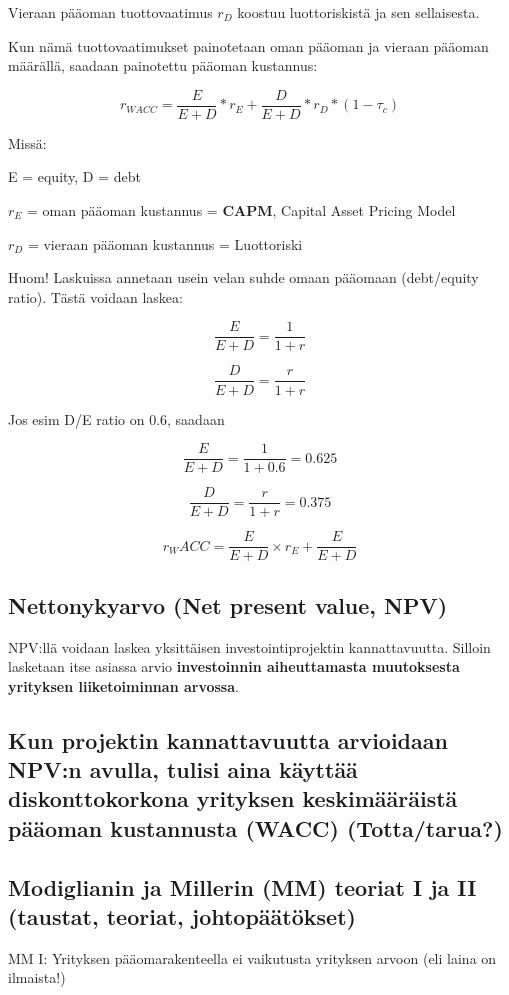 \documentclass[a4paper]{article}
\begin{document}
Vieraan pääoman tuottovaatimus $r_D$ koostuu luottoriskistä ja sen sellaisesta.

Kun nämä tuottovaatimukset painotetaan oman pääoman ja vieraan pääoman määrällä, saadaan painotettu pääoman kustannus:

\[
r_{WACC} = \frac{E}{E + D} * r_E + \frac{D}{E + D} * r_D * (1 - \tau_c)
\]

Missä: 

E = equity, D = debt

$r_E$ = oman pääoman kustannus = \textbf{CAPM}, Capital Asset Pricing Model

$r_D$ = vieraan pääoman kustannus = Luottoriski

Huom! Laskuissa annetaan usein velan suhde omaan pääomaan (debt/equity ratio). Tästä voidaan laskea:

\[
\frac{E}{E + D} = \frac{1}{1 +r}
\]

\[
\frac{D}{E + D} = \frac{r}{1 +r}
\]

Jos esim D/E ratio on 0.6, saadaan

\[
\frac{E}{E + D} = \frac{1}{1 + 0.6} = 0.625
\]

\[
\frac{D}{E + D} = \frac{r}{1 +r} = 0.375
\]

\[
    r_WACC = \frac{E}{E + D} \times r_E + \frac{E}{E + D}
\]

\subsection{Nettonykyarvo (Net present value, NPV)}

NPV:llä voidaan laskea yksittäisen investointiprojektin kannattavuutta. Silloin lasketaan itse asiassa arvio \textbf{investoinnin aiheuttamasta muutoksesta yrityksen liiketoiminnan arvossa}. 

\subsection{Kun projektin kannattavuutta arvioidaan NPV:n avulla, tulisi aina käyttää diskonttokorkona yrityksen keskimääräistä pääoman kustannusta (WACC) (Totta/tarua?)}

\subsection{Modiglianin ja Millerin (MM) teoriat I ja II (taustat, teoriat, johtopäätökset)}

MM I: Yrityksen pääomarakenteella ei vaikutusta yrityksen arvoon (eli laina on ilmaista!)
\end{document}
